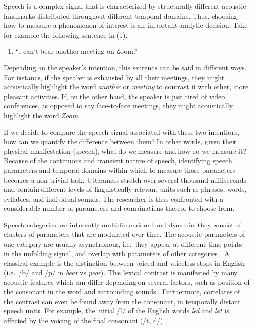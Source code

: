 \documentclass[Review,times,sageh]{sagej}
\providecommand{\tightlist}{\setlength{\itemsep}{0pt}\setlength{\parskip}{0pt}}
\begin{document}
Speech is a complex signal that is characterized by structurally different acoustic landmarks distributed throughout different temporal domains.
Thus, choosing how to measure a phenomenon of interest is an important analytic decision.
Take for example the following sentence in (1).

\vspace{1em}

\begin{enumerate}
\def\labelenumi{(\arabic{enumi})}
\tightlist
\item
  ``I can't bear another meeting on Zoom.''
  \vspace{1em}
\end{enumerate}

Depending on the speaker's intention, this sentence can be said in different ways.
For instance, if the speaker is exhausted by all their meetings, they might acoustically highlight the word \emph{another} or \emph{meeting} to contrast it with other, more pleasant activities.
If, on the other hand, the speaker is just tired of video conferences, as opposed to say face-to-face meetings, they might acoustically highlight the word \emph{Zoom}.

If we decide to compare the speech signal associated with these two intentions, how can we quantify the difference between them?
In other words, given their physical manifestation (speech), what do we measure and how do we measure it?
Because of the continuous and transient nature of speech, identifying speech parameters and temporal domains within which to measure those parameters becomes a non-trivial task.
Utterances stretch over several thousand milliseconds and contain different levels of linguistically relevant units such as phrases, words, syllables, and individual sounds.
The researcher is thus confronted with a considerable number of parameters and combinations thereof to choose from.

Speech categories are inherently multidimensional and dynamic: they consist of clusters of parameters that are modulated over time.
The acoustic parameters of one category are usually asynchronous, i.e.~they appear at different time points in the unfolding signal, and overlap with parameters of other categories \citep[e.g.][]{jongman2000acoustic, lisker1986voicing, summerfield1981articulatory, winter2014spoken}.
A classical example is the distinction between voiced and voiceless stops in English (i.e.~/b/ and /p/ in \emph{bear} vs \emph{pear}).
This lexical contrast is manifested by many acoustic features which can differ depending on several factors, such as position of the consonant in the word and surrounding sounds \citep{lisker1977rapid}.
Furthermore, correlates of the contrast can even be found away from the consonant, in temporally distant speech units.
For example, the initial /l/ of the English words \emph{led} and \emph{let} is affected by the voicing of the final consonant (/t, d/) \citep{hawkins2004influence}.
\end{document}
